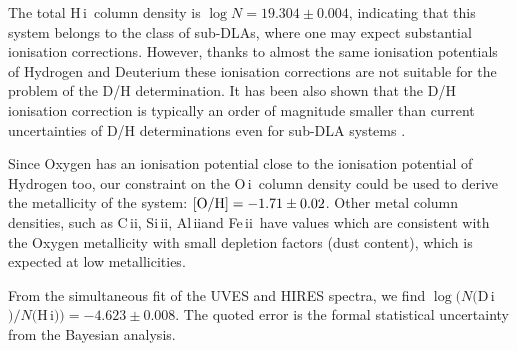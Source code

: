 \documentclass[fleqn,usenatbib]{mnras}
\newcommand{\DI}[0]{D\,{\sc i}}
\newcommand{\HI}[0]{H\,{\sc i}}
\newcommand{\OI}[0]{O\,{\sc i}}
\newcommand{\CII}[0]{C\,{\sc ii}}
\newcommand{\SiII}[0]{Si\,{\sc ii}}
\newcommand{\AlII}[0]{Al\,{\sc ii}}
\newcommand{\FeII}[0]{Fe\,{\sc ii}}
\begin{document}
The total \HI\ column density is $\log N=19.304\pm0.004$, indicating that this system belongs to the class of sub-DLAs, where one may expect substantial ionisation corrections. However, thanks to almost the same ionisation potentials of Hydrogen and Deuterium these ionisation corrections are not suitable for the problem of the D/H determination. It has been also shown that the D/H ionisation correction is typically an order of magnitude smaller than current uncertainties of D/H determinations even for sub-DLA systems \citep{Cooke_IC}.

Since Oxygen has an ionisation potential close to the ionisation potential of Hydrogen too, our constraint on the \OI\ column density could be used to derive the metallicity of the system: $\rm [O/H]=-1.71\pm 0.02$. Other metal column densities, such as \CII, \SiII,  \AlII and \FeII\ have values which are consistent with the Oxygen metallicity with small depletion factors (dust content), which is expected at low metallicities. 

From the simultaneous fit of the UVES and HIRES spectra, we find $\log (N($\DI$)/N($\HI$))=-4.623 \pm 0.008$. The quoted error is the formal statistical uncertainty from the Bayesian analysis.

\renewcommand*{\arraystretch}{1.4}
\end{document}
